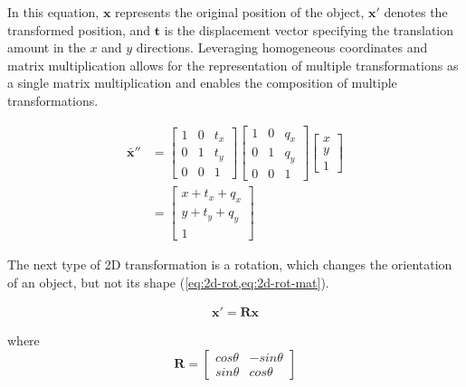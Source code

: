 In this equation, $\mathbf{x}$ represents the original position of the object, $\mathbf{x'}$ denotes the transformed position, and $\mathbf{t}$ is the displacement vector specifying the translation amount in the $x$ and $y$ directions.
Leveraging homogeneous coordinates and matrix multiplication allows for the representation of multiple transformations as a single matrix multiplication and enables the composition of multiple transformations.

\begin{equation}
    \begin{aligned}
        \mathbf{\bar{x}}'' &= \begin{bmatrix}
            1 & 0 & t_x \\ 0 & 1 & t_y \\ 0 & 0 & 1
        \end{bmatrix} 
        \begin{bmatrix}
            1 & 0 & q_x \\ 0 & 1 & q_y \\ 0 & 0 & 1
        \end{bmatrix} \begin{bmatrix}
            x \\ y \\ 1 
        \end{bmatrix}\\
        &= \begin{bmatrix}
            x + t_x + q_x \\ y + t_y + q_y \\ 1
        \end{bmatrix}
    \end{aligned}
    \label{eq:mult-translation}
\end{equation}

The next type of 2D transformation is a rotation, which changes the orientation of an object, but not its shape (\cref{eq:2d-rot,eq:2d-rot-mat}).

\begin{equation}
    \begin{aligned}
        \mathbf{x}' = \mathbf{Rx}
    \end{aligned}
    \label{eq:2d-rot}
\end{equation}

where
\begin{equation}
    \mathbf{R} = \begin{bmatrix}
        cos\theta & -sin \theta \\ sin \theta & cos \theta 
    \end{bmatrix}
    \label{eq:2d-rot-mat}
\end{equation}

